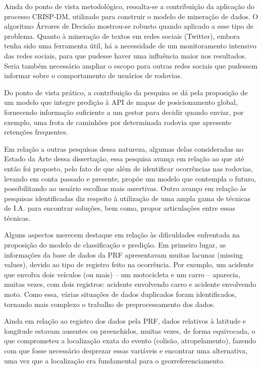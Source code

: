 Ainda do ponto de vista metodológico, ressalta-se a contribuição da aplicação do processo CRISP-DM,
utilizado para construir o modelo de mineração de dados. 
O algoritmo Árvores de Decisão mostrou-se robusto quando aplicado a esse tipo de problema.
Quanto à mineração de textos em redes sociais (Twitter), embora tenha sido uma ferramenta útil, há a necessidade de um monitoramento intensivo das redes sociais, para que pudesse haver uma influência maior nos resultados. Seria também necessário ampliar o escopo para outras redes sociais que pudessem informar sobre o comportamento de usuários de rodovias.

Do ponto de vista prático, a contribuição da pesquisa se dá pela proposição de um modelo que integre predição à
API de mapas de posicionamento global, fornecendo informação suficiente a um gestor para decidir quando enviar,
por exemplo, uma frota de caminhões por determinada rodovia que apresente retenções frequentes.

Em relação a outras pesquisas dessa natureza, algumas delas consideradas no Estado da Arte dessa dissertação, essa pesquisa avança em relação ao que até então foi proposto, pelo fato de que além de identificar ocorrências nas rodovias, levando em conta passado e presente, propõe um modelo que contempla o futuro, possibilitando ao usuário escolhas mais assertivas. Outro avanço em relação às pesquisas identificadas diz respeito à utilização de uma ampla gama de técnicas de I.A. para encontrar soluções, bem como, propor articulações entre essas técnicas. 

Alguns aspectos merecem destaque em relação às dificuldades enfrentada na proposição do modelo de classificação e predição. Em primeiro lugar, as informações da base de dados da PRF apresentavam muitas lacunas (missing values), devido ao tipo de registro feito na ocorrência. Por exemplo, um acidente que envolva dois veículos (ou mais) -- um motocicleta e um carro -- aparecia, muitas vezes, com dois registros: acidente envolvendo carro e acidente envolvendo moto. Como essa, várias situações de dados duplicados foram identificados, tornando mais complexo o trabalho de preprocessamento dos dados.

Ainda em relação ao registro dos dados pela PRF, dados relativos à latitude e longitude estavam ausentes ou preenchidos, muitas vezes, de forma equivocada, o que comprometeu a localização exata do evento (colisão, atropelamento), fazendo com que fosse necessário desprezar essas variáveis e encontrar uma alternativa, uma vez que a localização era fundamental para o georreferenciamento.

